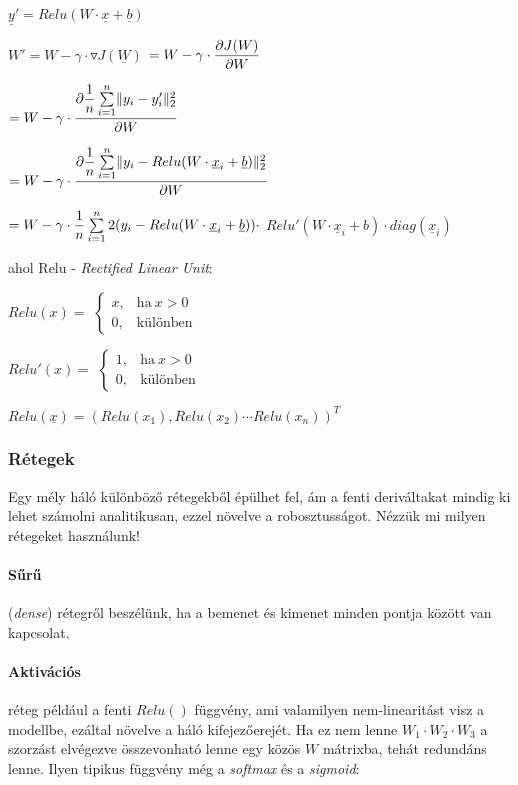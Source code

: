 $ \underline{y}' = Relu(W \cdot \underline{x} + \underline{b}) $

$ W' = W - \gamma \cdot  \triangledown  J(\underline{W})$
$ = W - \gamma \cdot \dfrac{\partial {J(W)}}{\partial {W}} $

$ = W - \gamma \cdot  \dfrac{\partial { \dfrac{1}{n} \sum\limits_{{i}=1}^{n} \lVert y_i-y_i'\rVert_2^2}}{\partial {W}} $


$ = W - \gamma \cdot \dfrac{\partial { \dfrac{1}{n} \sum\limits_{{i}=1}^{n} \lVert y_i-Relu(W \cdot \underline{x}_i + \underline{b})\rVert_2^2}}{\partial {W}} $

$ = W - \gamma \cdot \dfrac{1}{n} \sum\limits_{{i}=1}^{n} 2 (y_i-Relu(W \cdot \underline{x}_i + \underline{b})) \cdot   $
$ Relu'(W \cdot \underline{x}_i + b) \cdot  diag(\underline{x}_i) $


\noindent
ahol Relu - \textit{Rectified Linear Unit}:


$ Relu(x) =  $
$ \begin{cases}
x, & \text{ha}\ x > 0 \\
0, & \text{különben}
\end{cases} $

$ Relu'(x) =  $
$ \begin{cases}
1, & \text{ha}\ x > 0 \\
0, & \text{különben}
\end{cases} $

$ Relu(\underline{x}) = (Relu(x_1), Relu(x_2) \cdots Relu(x_n))^T $



\subsubsection{Rétegek}


Egy mély háló különböző rétegekből épülhet fel, ám a fenti deriváltakat
mindig ki lehet számolni analitikusan, ezzel növelve a robosztusságot.
Nézzük mi milyen rétegeket használunk!

\paragraph{Sűrű} (\textit{dense}) rétegről beszélünk, ha a bemenet és kimenet 
minden pontja között van kapcsolat.

\paragraph{Aktivációs} réteg például a fenti $ Relu() $ függvény, ami 
valamilyen nem-linearitást visz a modellbe, ezáltal növelve a háló 
kifejezőerejét. Ha ez nem lenne $ W_1 \cdot W_2 \cdot W_3 $ a szorzást 
elvégezve összevonható lenne egy közös $ W $ mátrixba, tehát redundáns 
lenne. Ilyen tipikus függvény még a \textit{softmax} és a \textit{sigmoid}:

